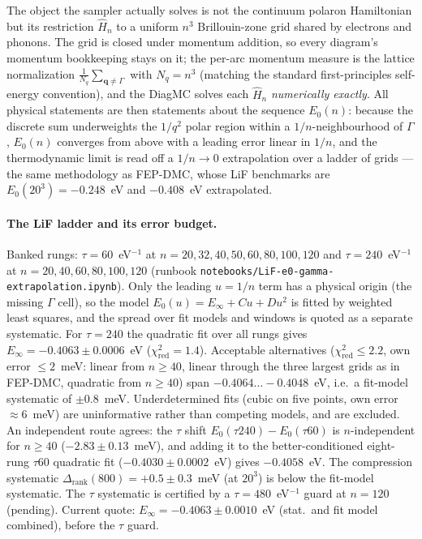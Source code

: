 \documentclass[11pt]{article}
\newcommand{\qv}{\mathbf{q}}
\begin{document}
The object the sampler actually solves is not the continuum polaron Hamiltonian but its
restriction $\hat H_{n}$ to a uniform $n^{3}$ Brillouin-zone grid shared by electrons and
phonons. The grid is closed under momentum addition, so every diagram's momentum
bookkeeping stays on it; the per-arc momentum measure is the lattice normalization
$\frac{1}{N_{q}}\sum_{\qv\neq\Gamma}$ with $N_{q}=n^{3}$ (matching the standard
first-principles self-energy convention), and the DiagMC solves each $\hat H_{n}$
\emph{numerically exactly}. All physical statements are then statements about the sequence
$E_{0}(n)$: because the discrete sum underweights the $1/q^{2}$ polar region within a
$1/n$-neighbourhood of $\Gamma$, $E_{0}(n)$ converges from above with a leading error
linear in $1/n$, and the thermodynamic limit is read off a $1/n\to0$ extrapolation
over a ladder of grids --- the same methodology as FEP-DMC, whose
LiF benchmarks are $E_{0}(20^{3})=-0.248$~eV and $-0.408$~eV extrapolated.

\paragraph{The LiF ladder and its error budget.} Banked rungs: $\tau=60$~eV$^{-1}$ at $n=20,32,40,50,60,80,100,120$ and $\tau=240$~eV$^{-1}$ at $n=20,40,60,80,100,120$ (runbook \texttt{notebooks/LiF-e0-gamma-extrapolation.ipynb}). Only the leading $u=1/n$ term has a physical origin (the missing $\Gamma$ cell), so the model $E_{0}(u)=E_{\infty}+Cu+Du^{2}$ is fitted by weighted least squares, and the spread over fit models and windows is quoted as a separate systematic. For $\tau=240$ the quadratic fit over all rungs gives $E_{\infty}=-0.4063\pm0.0006$~eV ($\chi^{2}_{\mathrm{red}}=1.4$). Acceptable alternatives ($\chi^{2}_{\mathrm{red}}\le2.2$, own error $\le2$~meV: linear from $n\ge40$, linear through the three largest grids as in FEP-DMC, quadratic from $n\ge40$) span $-0.4064\ldots-0.4048$~eV, i.e.\ a fit-model systematic of $\pm0.8$~meV. Underdetermined fits (cubic on five points, own error $\approx6$~meV) are uninformative rather than competing models, and are excluded. An independent route agrees: the $\tau$ shift $E_{0}(\tau240)-E_{0}(\tau60)$ is $n$-independent for $n\ge40$ ($-2.83\pm0.13$~meV), and adding it to the better-conditioned eight-rung $\tau60$ quadratic fit ($-0.4030\pm0.0002$~eV) gives $-0.4058$~eV. The compression systematic $\Delta_{\mathrm{rank}}(800)=+0.5\pm0.3$~meV (at $20^{3}$) is below the fit-model systematic. The $\tau$ systematic is certified by a $\tau=480$~eV$^{-1}$ guard at $n=120$ (pending). Current quote: $E_{\infty}=-0.4063\pm0.0010$~eV (stat.\ and fit model combined), before the $\tau$ guard.
\end{document}
